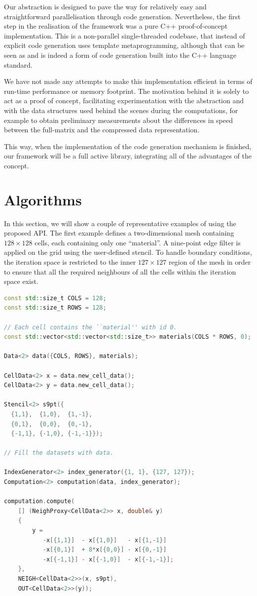 \documentclass[fontsize=11pt, appendixprefix=true]{scrreprt}
\begin{document}
Our abstraction is designed to pave the way for relatively easy and
straightforward parallelisation through code generation. Nevertheless, the first
step in the realisation of the framework was a pure C++ proof-of-concept
implementation. This is a non-parallel single-threaded codebase, that instead of
explicit code generation uses template metaprogramming, although that can be
seen as and is indeed a form of code generation built into the C++ language
standard.

We have not made any attempts to make this implementation efficient in terms of
run-time performance or memory footprint. The motivation behind it is solely to
act as a proof of concept, facilitating experimentation with the abstraction and
with the data structures used behind the scenes during the computations, for
example to obtain preliminary measurements about the differences in speed
between the full-matrix and the compressed data representation.

This way, when the implementation of the code generation mechanism is finished,
our framework will be a full active library, integrating all of the advantages
of the concept.

\section{Algorithms}

In this section, we will show a couple of representative examples of using the
proposed API. The first example defines a two-dimensional mesh containing $128
\times 128$ cells, each containing only one ``material''. A nine-point edge
filter is applied on the grid using the user-defined stencil. To handle boundary
conditions, the iteration space is restricted to the inner $127 \times 127$
region of the mesh in order to ensure that all the required neighbours of all
the cells within the iteration space exist.

\begin{lstlisting}[language=c++]
const std::size_t COLS = 128;
const std::size_t ROWS = 128;

// Each cell contains the ``material'' with id 0.
const std::vector<std::vector<std::size_t>> materials(COLS * ROWS, 0);

Data<2> data({COLS, ROWS}, materials);

CellData<2> x = data.new_cell_data();
CellData<2> y = data.new_cell_data();

Stencil<2> s9pt({
  {1,1},  {1,0},  {1,-1},
  {0,1},  {0,0},  {0,-1},
  {-1,1}, {-1,0}, {-1,-1}});

// Fill the datasets with data.
	
IndexGenerator<2> index_generator({1, 1}, {127, 127});
Computation<2> computation(data, index_generator);
	
computation.compute(
    [] (NeighProxy<CellData<2>> x, double& y)
    {
        y = 
           -x[{1,1}]  - x[{1,0}]   - x[{1,-1}]
           -x[{0,1}]  + 8*x[{0,0}] - x[{0,-1}]
           -x[{-1,1}] - x[{-1,0}]  - x[{-1,-1}];
    },
    NEIGH<CellData<2>>(x, s9pt),
    OUT<CellData<2>>(y));
\end{lstlisting}
\end{document}

